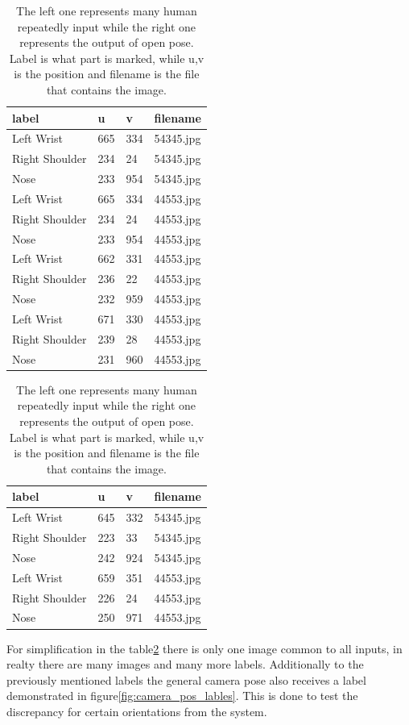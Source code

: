 \begin{table}[h]
    \centering
    \begin{tabular}{|llll|}
        label & u & v & filename\\
        \hline
        Left Wrist      & 665 & 334     & 54345.jpg \\
        Right Shoulder  & 234 & 24      & 54345.jpg \\
        Nose            & 233 & 954     & 54345.jpg \\
        Left Wrist      & 665 & 334     & 44553.jpg \\
        Right Shoulder  & 234 & 24      & 44553.jpg \\
        Nose            & 233 & 954     & 44553.jpg \\

        Left Wrist      & 662 & 331     & 44553.jpg \\
        Right Shoulder  & 236 & 22      & 44553.jpg \\
        Nose            & 232 & 959     & 44553.jpg \\
        Left Wrist      & 671 & 330     & 44553.jpg \\
        Right Shoulder  & 239 & 28      & 44553.jpg \\
        Nose            & 231 & 960     & 44553.jpg
    \end{tabular}
    \begin{tabular}{|llll|}
        label & u & v & filename\\
        \hline
        Left Wrist      & 645 & 332     & 54345.jpg \\
        Right Shoulder  & 223 & 33      & 54345.jpg \\
        Nose            & 242 & 924     & 54345.jpg \\
       Left Wrist      & 659 & 351     & 44553.jpg \\
       Right Shoulder  & 226 & 24      & 44553.jpg \\
       Nose            & 250 & 971     & 44553.jpg
    \end{tabular}
    \caption[Output data example]{The left one represents many human repeatedly input while the right one represents the output of open pose. Label is what part is marked, while u,v is the position and filename is the file that contains the image.}
    \label{tab:impl:input}
\end{table}
For simplification in the table\ref{tab:impl:input} there is only one image common to all inputs, in realty there are many images and many more labels.
Additionally to the previously mentioned labels the general camera pose also receives a label demonstrated in figure\ref{fig:camera_pos_lables}.
This is done to test the discrepancy for certain orientations from the \openpose{ }  system.

